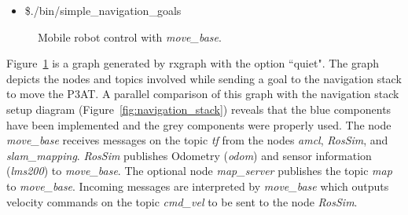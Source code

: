 \begin{itemize}
\item[]\$./bin/simple\_navigation\_goals
\end{itemize}


\begin{figure}[t!]
\centering
{}
\caption{\label{fig:movebase}Mobile robot control with {\it move\_base}.}
\end{figure}
      


Figure~\ref{fig:movebase} is a graph generated by rxgraph with the option ``quiet". The graph depicts the nodes and topics involved while sending a goal to  the navigation stack to move the P3AT. A parallel comparison of this graph with the navigation stack setup diagram (Figure~\ref{fig:navigation_stack}) reveals that the blue components have been implemented and the grey components were properly used. The node {\it move\_base} receives messages on the topic {\it tf} from the nodes {\it amcl}, {\it RosSim}, and {\it slam\_mapping}. {\it RosSim} publishes Odometry ({\it odom}) and sensor information ({\it lms200}) to {\it move\_base}. The optional node {\it map\_server} publishes the topic {\it map} to {\it move\_base}. Incoming messages are interpreted by {\it move\_base} which outputs velocity commands on the topic {\it cmd\_vel} to be sent to the node {\it RosSim}.
